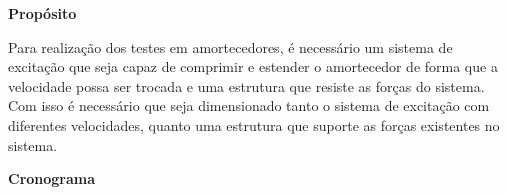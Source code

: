 	\textbf{Propósito}

		Para realização dos testes em amortecedores, é necessário um sistema de excitação que seja capaz de comprimir e estender o amortecedor de forma que a velocidade possa ser trocada e uma estrutura que resiste as forças do sistema. Com isso é necessário que seja dimensionado tanto o sistema de excitação com diferentes velocidades, quanto uma estrutura que suporte as forças existentes no sistema. 


	\textbf{Cronograma}

		\newpage
		\begin{table}[]
			\centering
			\caption{My caption}
			\label{my-label}
\end{table}
